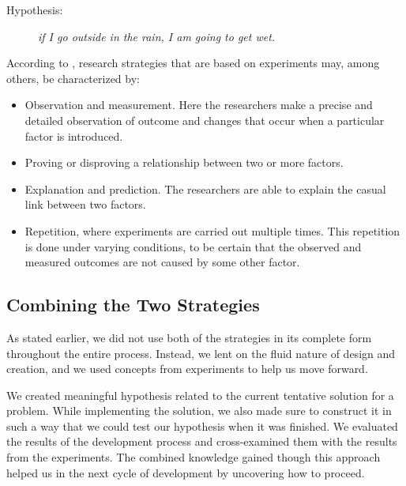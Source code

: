\begin{description}
    \item[Hypothesis:]{\textit{if I go outside in the rain, I am going to get wet.}}
\end{description}

According to \cite{oates2005researching}, research strategies that are based on experiments may, among others, be characterized by:

\begin{itemize}
    \item Observation and measurement. Here the researchers make a precise and detailed observation of outcome and changes that occur when a particular factor is introduced.
    \item Proving or disproving a relationship between two or more factors.
    \item Explanation and prediction. The researchers are able to explain the casual link between two factors.
    \item Repetition, where experiments are carried out multiple times. This repetition is done under varying conditions, to be certain that the observed and measured outcomes are not caused by some other factor.
\end{itemize}

\subsection{Combining the Two Strategies}
\label{sec:combining_the_two_strategies}
As stated earlier, we did not use both of the strategies in its complete form throughout the entire process. Instead, we lent on the fluid nature of design and creation, and we used concepts from experiments to help us move forward. 

We created meaningful hypothesis related to the current tentative solution for a problem. While implementing the solution, we also made sure to construct it in such a way that we could test our hypothesis when it was finished. We evaluated the results of the development process and cross-examined them with the results from the experiments. The combined knowledge gained though this approach helped us in the next cycle of development by uncovering how to proceed.



